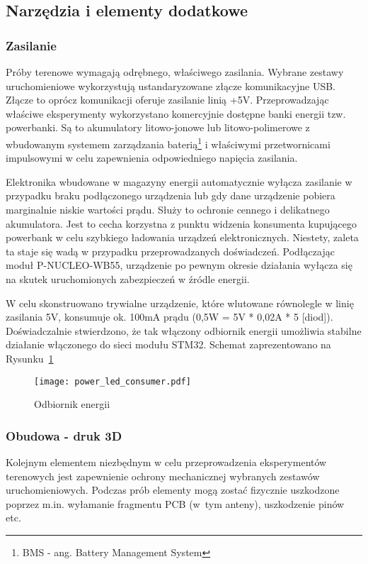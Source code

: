 \subsection{Narzędzia i elementy dodatkowe}

\subsubsection{Zasilanie}
Próby terenowe wymagają odrębnego, właściwego zasilania. Wybrane zestawy uruchomieniowe
wykorzystują ustandaryzowane złącze komunikacyjne USB. Złącze to oprócz komunikacji
oferuje zasilanie linią +5V. Przeprowadzając właściwe eksperymenty wykorzystano
komercyjnie dostępne banki energii tzw. powerbanki. Są to akumulatory litowo-jonowe
lub litowo-polimerowe z wbudowanym systemem zarządzania baterią\footnote{\gls{BMS} - ang. Battery Management System}
i właściwymi przetwornicami impulsowymi w celu zapewnienia odpowiedniego napięcia zasilania.

Elektronika wbudowane w magazyny energii automatycznie wyłącza zasilanie w przypadku braku
podłączonego urządzenia lub gdy dane urządzenie pobiera marginalnie niskie wartości
prądu. Służy to ochronie cennego i delikatnego akumulatora. Jest to cecha korzystna
z punktu widzenia konsumenta kupującego powerbank w celu szybkiego ładowania urządzeń elektronicznych.
Niestety, zaleta ta staje się wadą w przypadku przeprowadzanych doświadczeń. Podłączając moduł P-NUCLEO-WB55,
urządzenie po pewnym okresie działania wyłącza się na skutek uruchomionych zabezpieczeń w źródle energii.

W celu skonstruowano trywialne urządzenie, które wlutowane równolegle w linię zasilania 5V,
konsumuje ok. 100mA prądu (0,5W = 5V * 0,02A * 5 [diod]). Doświadczalnie stwierdzono, że tak włączony
odbiornik energii umożliwia stabilne działanie włączonego do sieci modułu STM32. Schemat 
zaprezentowano na Rysunku~\ref{rys:power_led_consumer}

\begin{figure}[!ht]
	\centering \texttt{[image: power\_led\_consumer.pdf]}
	\caption{Odbiornik energii}
	\label{rys:power_led_consumer}
\end{figure}

\subsubsection{Obudowa - druk 3D}
Kolejnym elementem niezbędnym w celu przeprowadzenia eksperymentów terenowych jest zapewnienie
ochrony mechanicznej wybranych zestawów uruchomieniowych. Podczas prób elementy mogą zostać
fizycznie uszkodzone poprzez m.in. wyłamanie fragmentu \gls{PCB} (w~tym anteny), uszkodzenie pinów etc.

